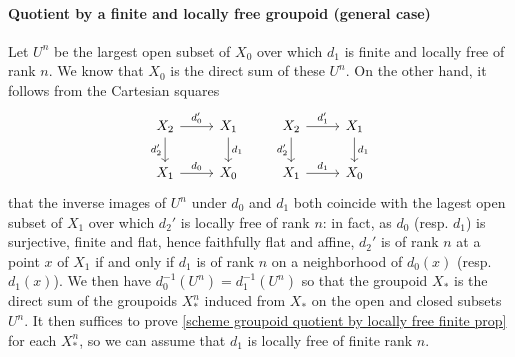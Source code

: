 \paragraph{Quotient by a finite and locally free groupoid (general case)}
Let $U^n$ be the largest open subset of $X_0$ over which $d_1$ is finite and locally free of rank $n$. We know that $X_0$ is the direct sum of these $U^n$. On the other hand, it follows from the Cartesian squares
\[\begin{tikzcd}
X_2\ar[r,"d_0'"]\ar[d,swap,"d_2'"]&X_1\ar[d,"d_1"]\\
X_1\ar[r,"d_0"]&X_0
\end{tikzcd}\quad\quad \begin{tikzcd}
X_2\ar[r,"d_1'"]\ar[d,swap,"d_2'"]&X_1\ar[d,"d_1"]\\
X_1\ar[r,"d_1"]&X_0
\end{tikzcd}\]
that the inverse images of $U^n$ under $d_0$ and $d_1$ both coincide with the lagest open subset of $X_1$ over which $d_2'$ is locally free of rank $n$: in fact, as $d_0$ (resp. $d_1$) is surjective, finite and flat, hence faithfully flat and affine, $d_2'$ is of rank $n$ at a point $x$ of $X_1$ if and only if $d_1$ is of rank $n$ on a neighborhood of $d_0(x)$ (resp. $d_1(x)$). We then have $d_0^{-1}(U^n)=d_1^{-1}(U^n)$ so that the groupoid $X_*$ is the direct sum of the groupoids $X_*^n$ induced from $X_*$ on the open and closed subsets $U^n$. It then suffices to prove \cref{scheme groupoid quotient by locally free finite prop} for each $X_*^n$, so we can assume that $d_1$ is locally free of finite rank $n$.\par 

